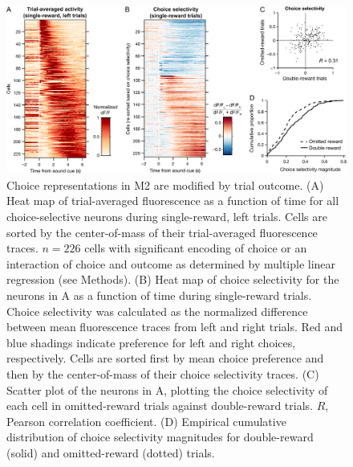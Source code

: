 \begin{figure}[htbp]

\begin{center}
\includegraphics[width=\textwidth]{Figures/CC_fig5.png} 
\end{center}

\caption[Choice representations were modified by trial outcome.]
{Choice representations in M2 are modified by trial outcome. (A) Heat map of trial-averaged fluorescence as a function of time for all choice-selective neurons during single-reward, left trials. Cells are sorted by the center-of-mass of their trial-averaged fluorescence traces. $n = 226$ cells with significant encoding of choice or an interaction of choice and outcome as determined by multiple linear regression (see Methods). (B) Heat map of choice selectivity for the neurons in A as a function of time during single-reward trials. Choice selectivity was calculated as the normalized difference between mean fluorescence traces from left and right trials. Red and blue shadings indicate preference for left and right choices, respectively. Cells are sorted first by mean choice preference and then by the center-of-mass of their choice selectivity traces. (C) Scatter plot of the neurons in A, plotting the choice selectivity of each cell in omitted-reward trials against double-reward trials. $R$, Pearson correlation coefficient. (D) Empirical cumulative distribution of choice selectivity magnitudes for double-reward (solid) and omitted-reward (dotted) trials.}

\label{fig:CC_fig5}
\end{figure}